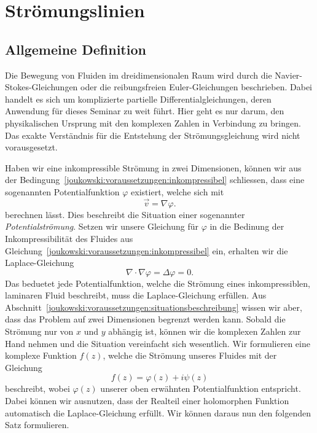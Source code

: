 \section{Strömungslinien}
\label{joukowski:sec:stroemungslinien}
	\subsection{Allgemeine Definition}
		Die Bewegung von Fluiden im dreidimensionalen Raum wird durch die Navier-Stokes-Gleichungen
		oder die reibungsfreien Euler-Gleichungen beschrieben.
		Dabei handelt es sich um komplizierte partielle Differentialgleichungen,
		deren Anwendung für dieses Seminar zu weit führt.
		Hier geht es nur darum, den physikalischen Ursprung mit den komplexen Zahlen in Verbindung zu bringen.
		Das exakte Verständnis für die Entstehung der Strömungsgleichung wird nicht vorausgesetzt.
		
		Haben wir eine inkompressible Strömung in zwei Dimensionen,
		können wir aus der Bedingung~\eqref{joukowski:voraussetzungen:inkompressibel} schliessen,
		dass eine sogenannten Potentialfunktion $\varphi$ existiert,
		welche sich mit
		\[
			\vec{v}
			=
			\nabla \varphi.
		\]
		berechnen lässt.
		Dies beschreibt die Situation einer sogenannter \emph{Potentialströmung}.
%
		Setzen wir unsere Gleichung für $\varphi$ in die Bedinung der Inkompressibilität des Fluides aus Gleichung~\eqref{joukowski:voraussetzungen:inkompressibel} ein,
		erhalten wir die Laplace-Gleichung
%
		\[
			\nabla \cdot \nabla \varphi
			=
			\Delta \varphi
			=
			0.
		\]
		Das beduetet jede Potentialfunktion, welche die Strömung eines inkompressiblen, laminaren Fluid beschreibt, muss die Laplace-Gleichung erfüllen.
%
		Aus Abschnitt~\ref{joukowski:voraussetzungen:situationsbeschreibung}
		wissen wir aber, dass das Problem auf zwei Dimensionen begrenzt werden kann.
		Sobald die Strömung nur von $x$ und $y$ abhängig ist,
		können wir die komplexen Zahlen zur Hand nehmen und die Situation vereinfacht sich wesentlich.
		Wir formulieren eine komplexe Funktion $f(z)$, welche die Strömung unseres Fluides mit der Gleichung
		\[
			f(z)
			= 
			\varphi(z) + i \psi(z)
		\]
		beschreibt, wobei $\varphi(z)$ unserer oben erwähnten Potentialfunktion entspricht.
		Dabei können wir ausnutzen, dass der Realteil einer holomorphen Funktion automatisch die Laplace-Gleichung erfüllt.
		Wir können daraus nun den folgenden Satz formulieren.
		

